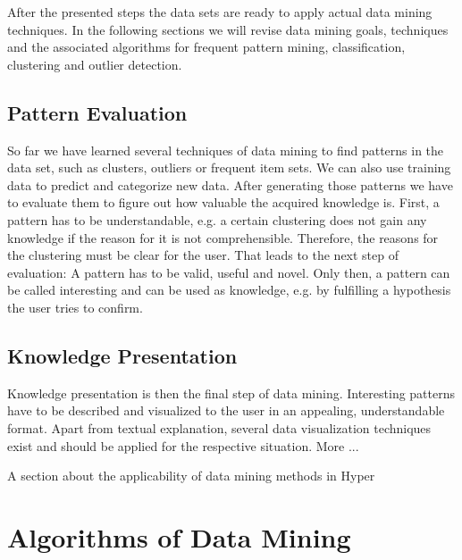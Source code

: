 After the presented steps the data sets are ready to apply actual data mining techniques. In the following sections we will revise data mining goals, techniques and the associated algorithms for frequent pattern mining, classification, clustering and outlier detection.


\subsection{Pattern Evaluation}

So far we have learned several techniques of data mining to find patterns in the data set, such as clusters, outliers or frequent item sets. We can also use training data to predict and categorize new data. 
After generating those patterns we have to evaluate them to figure out how valuable the acquired knowledge is. First, a pattern has to be understandable, e.g. a certain clustering does not gain any knowledge if the reason for it is not comprehensible. Therefore, the reasons for the clustering must be clear for the user. That leads to the next step of evaluation: A pattern has to be valid, useful and novel. Only then, a pattern can be called interesting and can be used as knowledge, e.g. by fulfilling a hypothesis the user tries to confirm. 


\subsection{Knowledge Presentation}

Knowledge presentation is then the final step of data mining. Interesting patterns have to be described and visualized to the user in an appealing, understandable format. Apart from textual explanation, several data visualization techniques exist and should be applied for the respective situation.
More ...

A section about the applicability of data mining methods in Hyper


\section{Algorithms of Data Mining}

